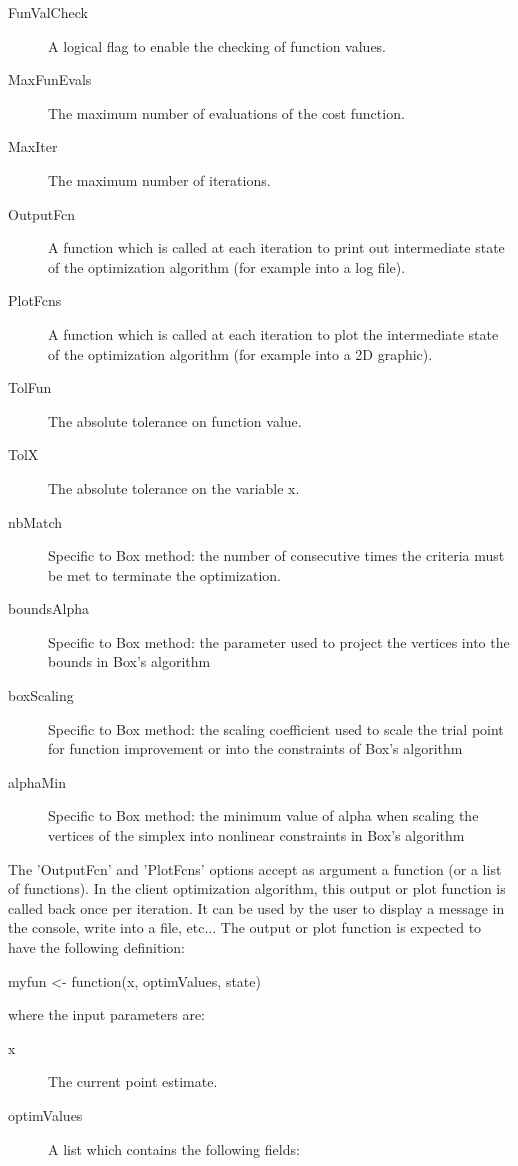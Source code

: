 \begin{Details}
\begin{description}
\begin{description}
\end{description}


\item[FunValCheck] A logical flag to enable the checking of function values.
\item[MaxFunEvals] The maximum number of evaluations of the cost function.
\item[MaxIter] The maximum number of iterations.
\item[OutputFcn] A function which is called at each iteration to print out
intermediate state of the optimization algorithm (for example into a log
file).
\item[PlotFcns] A function which is called at each iteration to plot the
intermediate state of the optimization algorithm (for example into a 2D
graphic).
\item[TolFun] The absolute tolerance on function value.
\item[TolX] The absolute tolerance on the variable x.
\item[nbMatch] Specific to Box method: the number of consecutive times the 
 criteria must be met to terminate the optimization.
\item[boundsAlpha] Specific to Box method: the parameter used to project the 
vertices into the bounds in Box's algorithm
\item[boxScaling] Specific to Box method: the scaling coefficient used to 
scale the trial point for function improvement or into the constraints of 
Box's algorithm
\item[alphaMin] Specific to Box method: the minimum value of alpha when 
scaling the vertices of the simplex into nonlinear constraints in Box's 
algorithm

\end{description}


The 'OutputFcn' and 'PlotFcns' options accept as argument a function (or a
list of functions). In the client optimization algorithm, this output or plot
function is called back once per iteration. It can be used by the user to
display a message in the console, write into a file, etc...
The output or plot function is expected to have the following definition:

myfun <- function(x, optimValues, state)

where the input parameters are:\begin{description}

\item[x] The current point estimate.
\item[optimValues] A list which contains the following fields:\begin{description}


\end{description}
\end{description}
\end{Details}
